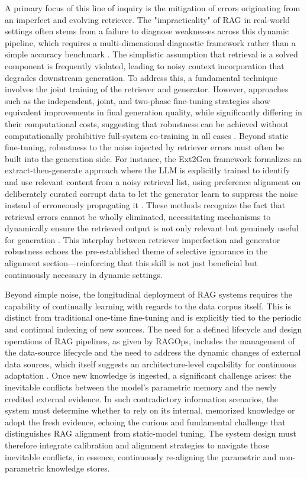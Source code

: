 \documentclass[11pt,a4paper]{article}
\begin{document}
A primary focus of this line of inquiry is the mitigation of errors originating from an imperfect and evolving retriever. The "impracticality" of RAG in real-world settings often stems from a failure to diagnose weaknesses across this dynamic pipeline, which requires a multi-dimensional diagnostic framework rather than a simple accuracy benchmark \cite{arxiv:2604.02640v1}. The simplistic assumption that retrieval is a solved component is frequently violated, leading to noisy context incorporation that degrades downstream generation. To address this, a fundamental technique involves the joint training of the retriever and generator. However, approaches such as the independent, joint, and two-phase fine-tuning strategies show equivalent improvements in final generation quality, while significantly differing in their computational costs, suggesting that robustness can be achieved without computationally prohibitive full-system co-training in all cases \cite{arxiv:2510.01600v2}. Beyond static fine-tuning, robustness to the noise injected by retriever errors must often be built into the generation side. For instance, the Ext2Gen framework formalizes an extract-then-generate approach where the LLM is explicitly trained to identify and use relevant content from a noisy retrieval list, using preference alignment on deliberately curated corrupt data to let the generator learn to suppress the noise instead of erroneously propagating it \cite{arxiv:2503.04789v3}. These methods recognize the fact that retrieval errors cannot be wholly eliminated, necessitating mechanisms to dynamically ensure the retrieved output is not only relevant but genuinely useful for generation \cite{arxiv:2604.22849v1}. This interplay between retriever imperfection and generator robustness echoes the pre-established theme of selective ignorance in the alignment section---reinforcing that this skill is not just beneficial but continuously necessary in dynamic settings.

Beyond simple noise, the longitudinal deployment of RAG systems requires the capability of continually learning with regards to the data corpus itself. This is distinct from traditional one-time fine-tuning and is explicitly tied to the periodic and continual indexing of new sources. The need for a defined lifecycle and design operations of RAG pipelines, as given by RAGOps, includes the management of the data-source lifecycle and the need to address the dynamic changes of external data sources, which itself suggests an architecture-level capability for continuous adaptation \cite{arxiv:2506.03401v1}. Once new knowledge is ingested, a significant challenge arises: the inevitable conflicts between the model's parametric memory and the newly credited external evidence. In such contradictory information scenarios, the system must determine whether to rely on its internal, memorized knowledge or adopt the fresh evidence, echoing the curious and fundamental challenge that distinguishes RAG alignment from static-model tuning. The system design must therefore integrate calibration and alignment strategies to navigate those inevitable conflicts, in essence, continuously re-aligning the parametric and non-parametric knowledge stores.
\end{document}
